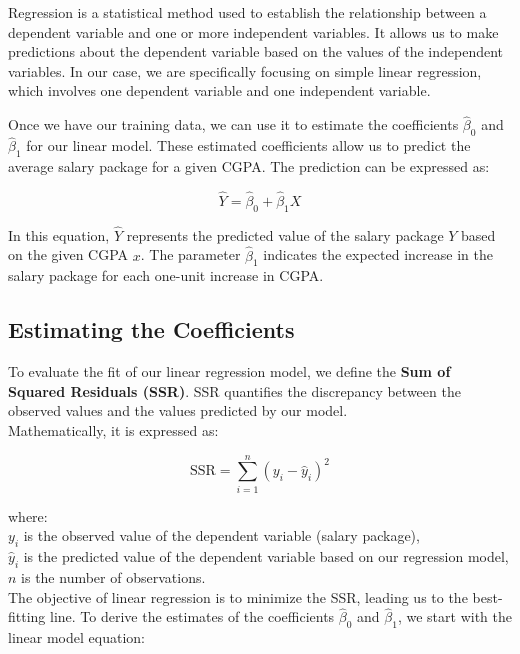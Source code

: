 \begin{definition}
    Regression is a statistical method used to establish the relationship between a dependent variable and one or more independent variables. It allows us to make predictions about the dependent variable based on the values of the independent variables. In our case, we are specifically focusing on simple linear regression, which involves one dependent variable and one independent variable.
\end{definition}

Once we have our training data, we can use it to estimate the coefficients \(\hat{\beta}_0\) and \(\hat{\beta}_1\) for our linear model. These estimated coefficients allow us to predict the average salary package for a given CGPA. The prediction can be expressed as:

\[
\hat{Y} = \hat{\beta}_0 + \hat{\beta}_1 X
\]

In this equation, \(\hat{Y}\) represents the predicted value of the salary package \(Y\) based on the given CGPA \(x\). The parameter \(\hat{\beta}_1\) indicates the expected increase in the salary package for each one-unit increase in CGPA.

\subsection{Estimating the Coefficients}

To evaluate the fit of our linear regression model, we define the \textbf{Sum of Squared Residuals (SSR)}. SSR quantifies the discrepancy between the observed values and the values predicted by our model. \\

Mathematically, it is expressed as:

\[
\text{SSR} = \sum_{i=1}^{n} (y_i - \hat{y}_i)^2
\]

where:\\
\(y_i\) is the observed value of the dependent variable (salary package),\\
\(\hat{y}_i\) is the predicted value of the dependent variable based on our regression model,\\
\(n\) is the number of observations.\\

The objective of linear regression is to minimize the SSR, leading us to the best-fitting line. To derive the estimates of the coefficients \(\hat{\beta}_0\) and \(\hat{\beta}_1\), we start with the linear model equation:

